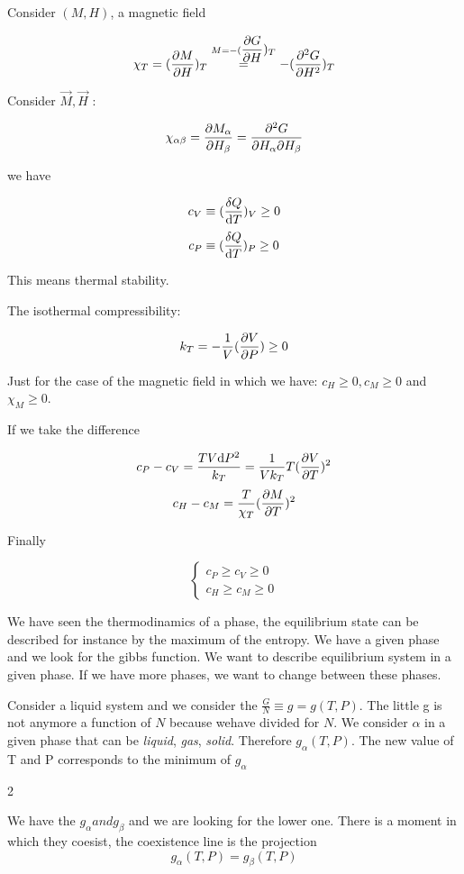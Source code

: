 \documentclass[../main/main.tex]{subfiles}
\begin{document}
Consider \( (M,H) \), a magnetic field

\[ \chi_T = (\displaystyle \frac{\partial M}{\partial H} )_T \overset{M = - (\displaystyle \frac{\partial G}{\partial H} )_T}{=} - (\displaystyle \frac{\partial^{2} G}{\partial H^{2} } )_T  \]

Consider \( \vec{M}, \vec{H}   \) :

\[ \chi_{\alpha \beta} = \displaystyle \frac{\partial M_ \alpha}{\partial H_ \beta} = \frac{\partial^2 G}{\partial H_ \alpha \partial H_ \beta} \]

we have

\[ c_V \equiv ( \frac{\delta Q}{\mathrm{d}{T}})_V \ge 0 \]
\[ c_P \equiv ( \frac{\delta Q}{\mathrm{d}{T}})_P \ge 0 \]

This means thermal stability.

The isothermal compressibility:

\[ k_T = - \frac{1}{V} (\displaystyle \frac{\partial V}{\partial P} ) \ge 0 \]

Just for the case of the magnetic field in which we have: \( c_H \ge 0 , c_M \ge 0 \) and \( \chi_M \ge 0 \).

If we take the difference

\[ c_P - c_V = \frac{T V \mathrm{d}{P}^2}{k_T} = \frac{1}{V k_T} T (\displaystyle \frac{\partial V}{\partial T} )^2 \]
\[ c_H - c_M = \frac{T}{\chi_T} (\displaystyle \frac{\partial M}{\partial T} )^2 \]

Finally

\begin{equation}
  \begin{cases}
  c_P \ge c_V \ge 0 \\
  c_H \ge c_M \ge 0
  \end{cases}
\label{eq:}
\end{equation}

We have seen the thermodinamics of a phase, the equilibrium state can be described for instance by the maximum of the entropy. We have a given phase and we look for the gibbs function. We want to describe equilibrium system in a given phase. If we have more phases, we want to change between these phases.

Consider a liquid system and we consider the \( \frac{G}{N} \equiv g = g (T,P) \). The little g is not anymore a function of $N$ because wehave divided for $N$.
We consider $\alpha$ in a given phase that can be \emph{liquid}, \emph{gas}, \emph{solid}. Therefore \( g_ \alpha (T,P) \).
The new value of T and P corresponds to the minimum of \( g_ \alpha \)

2

We have the \( g_ \alpha and g_\beta \) and we are looking for the lower one. There is a moment in which they coesist, the coexistence line is the projection
\[ g_ \alpha(T,P) = g_ \beta(T,P) \]
\end{document}
